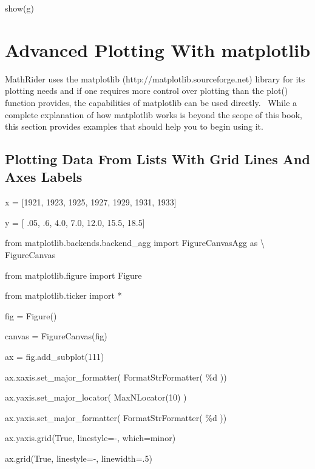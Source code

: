 \documentclass[12pt,twoside]{book}
\begin{document}
show(g)

{\textbar}


\bigskip


\bigskip

\section[Advanced Plotting With matplotlib]{Advanced Plotting With matplotlib}

MathRider uses the matplotlib (http://matplotlib.sourceforge.net) library for its plotting needs and if one requires more control over plotting than the plot() function provides, the capabilities of matplotlib can be used directly. \ While a complete explanation of how matplotlib works is beyond the scope of this book, this section provides examples that should help you to begin using it.

\subsection[Plotting Data From Lists With Grid Lines And Axes Labels]{ Plotting Data From Lists With Grid Lines And Axes Labels} 

\bigskip

x = [1921, 1923, 1925, 1927, 1929, 1931, 1933]

y = [ .05, .6, 4.0, 7.0, 12.0, 15.5, 18.5]


\bigskip

from matplotlib.backends.backend\_agg import FigureCanvasAgg as {\textbackslash} FigureCanvas

from matplotlib.figure import Figure

from matplotlib.ticker import *

fig = Figure()

canvas = FigureCanvas(fig)

ax = fig.add\_subplot(111)

ax.xaxis.set\_major\_formatter( FormatStrFormatter( {\textquotesingle}\%d{\textquotesingle} ))

ax.yaxis.set\_major\_locator( MaxNLocator(10) )

ax.yaxis.set\_major\_formatter( FormatStrFormatter(
{\textquotesingle}\%d{\textquotesingle} ))

ax.yaxis.grid(True, linestyle={\textquotesingle}{}-{\textquotesingle},
which={\textquotesingle}minor{\textquotesingle})

ax.grid(True, linestyle={\textquotesingle}{}-{\textquotesingle},
linewidth=.5)
\end{document}
